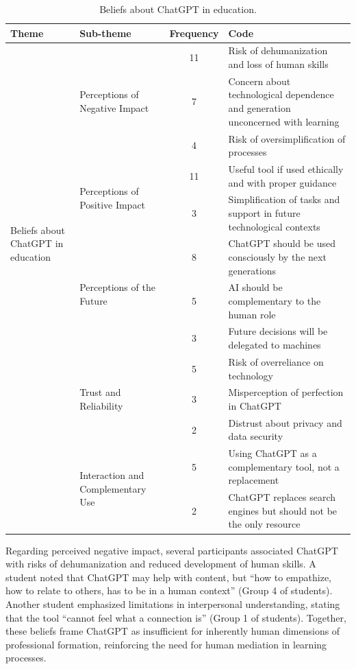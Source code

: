 \documentclass[english]{textolivre}
\begin{document}
\begin{table}[h!]
\centering
\begin{threeparttable}
\caption{Beliefs about ChatGPT in education.}
\label{tab4}
\begin{tabular}{p{3cm}p{3cm}c p{6cm}}
\toprule
Theme & Sub-theme & Frequency & Code \\
\midrule

\multirow{11}{=}{Beliefs about ChatGPT in education}

& \multirow{3}{=}{Perceptions of Negative Impact}
& 11 & Risk of dehumanization and loss of human skills \\
& & 7 & Concern about technological dependence and generation unconcerned with learning \\
& & 4 & Risk of oversimplification of processes \\

& \multirow{2}{=}{Perceptions of Positive Impact}
& 11 & Useful tool if used ethically and with proper guidance \\
& & 3 & Simplification of tasks and support in future technological contexts \\

& \multirow{3}{=}{Perceptions of the Future}
& 8 & ChatGPT should be used consciously by the next generations \\
& & 5 & AI should be complementary to the human role \\
& & 3 & Future decisions will be delegated to machines \\

& \multirow{3}{=}{Trust and Reliability}
& 5 & Risk of overreliance on technology \\
& & 3 & Misperception of perfection in ChatGPT \\
& & 2 & Distrust about privacy and data security \\

& \multirow{2}{=}{Interaction and Complementary Use}
& 5 & Using ChatGPT as a complementary tool, not a replacement \\
& & 2 & ChatGPT replaces search engines but should not be the only resource \\

\bottomrule
\end{tabular}
\end{threeparttable}
\end{table}

Regarding perceived negative impact, several participants associated ChatGPT with risks of dehumanization and reduced development of human skills. A student noted that ChatGPT may help with content, but “how to empathize, how to relate to others, has to be in a human context” (Group 4 of students). Another student emphasized limitations in interpersonal understanding, stating that the tool “cannot feel what a connection is” (Group 1 of students). Together, these beliefs frame ChatGPT as insufficient for inherently human dimensions of professional formation, reinforcing the need for human mediation in learning processes.
\end{document}
